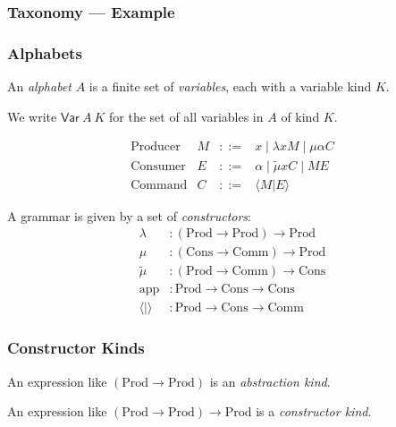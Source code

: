\documentclass{beamer}
\begin{document}
\begin{frame}
\frametitle{Taxonomy --- Example}
\end{frame}

\begin{frame}
\frametitle{Alphabets}
An \emph{alphabet} $A$ is a finite set of \emph{variables}, each with
a variable kind $K$.

We write $\mathsf{Var}\ A\ K$ for the set of all variables in $A$ of kind $K$.


\end{frame}

\begin{frame}
\[ \begin{array}{lrcl}
\text{Producer} & M & ::= & x \mid \lambda x M \mid \mu \alpha C \\
\text{Consumer} & E & ::= & \alpha \mid \tilde{\mu} x C \mid M E \\
\text{Command} & C & ::= & \langle M | E \rangle
\end{array} \]

A grammar is given by a set of \emph{constructors}:
\newcommand{\prd}{\mathrm{Prod}}
\newcommand{\cons}{\mathrm{Cons}}
\newcommand{\comm}{\mathrm{Comm}}
\begin{align*}
\lambda & : (\prd \rightarrow \prd) \rightarrow \prd \\
\mu & : (\cons \rightarrow \comm) \rightarrow \prd \\
\tilde{\mu} & : (\prd \rightarrow \comm) \rightarrow \cons \\
\mathrm{app} & : \prd \rightarrow \cons \rightarrow \cons \\
\langle | \rangle & : \prd \rightarrow \cons \rightarrow \comm
\end{align*}
\end{frame}

\begin{frame}
\frametitle{Constructor Kinds}
\newcommand{\prd}{\mathrm{Prod}}
\newcommand{\cons}{\mathrm{Cons}}
\newcommand{\comm}{\mathrm{Comm}}

An expression like $(\prd \rightarrow \prd)$ is an \emph{abstraction kind}.

An expression like $(\prd \rightarrow \prd) \rightarrow \prd$ is a \emph{constructor kind}.


\end{frame}
\end{document}
